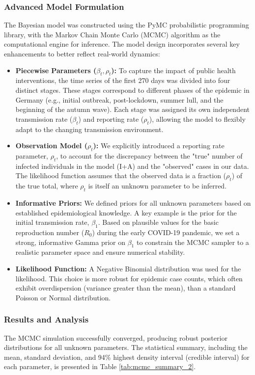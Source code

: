 \documentclass[12pt, a4paper]{article}
\begin{document}
\subsubsection{Advanced Model Formulation}
The Bayesian model was constructed using the PyMC probabilistic programming library, with the Markov Chain Monte Carlo (MCMC) algorithm as the computational engine for inference. The model design incorporates several key enhancements to better reflect real-world dynamics:
\begin{itemize}
    \item \textbf{Piecewise Parameters ($\beta_t, \rho_t$):} To capture the impact of public health interventions, the time series of the first 270 days was divided into four distinct stages. These stages correspond to different phases of the epidemic in Germany (e.g., initial outbreak, post-lockdown, summer lull, and the beginning of the autumn wave). Each stage was assigned its own independent transmission rate ($\beta_t$) and reporting rate ($\rho_t$), allowing the model to flexibly adapt to the changing transmission environment.
    \item \textbf{Observation Model ($\rho_t$):} We explicitly introduced a reporting rate parameter, $\rho_t$, to account for the discrepancy between the "true" number of infected individuals in the model (I+A) and the "observed" cases in our data. The likelihood function assumes that the observed data is a fraction ($\rho_t$) of the true total, where $\rho_t$ is itself an unknown parameter to be inferred.
    \item \textbf{Informative Priors:} We defined priors for all unknown parameters based on established epidemiological knowledge. A key example is the prior for the initial transmission rate, $\beta_1$. Based on plausible values for the basic reproduction number ($R_0$) during the early COVID-19 pandemic, we set a strong, informative Gamma prior on $\beta_1$ to constrain the MCMC sampler to a realistic parameter space and ensure numerical stability.
    \item \textbf{Likelihood Function:} A Negative Binomial distribution was used for the likelihood. This choice is more robust for epidemic case counts, which often exhibit overdispersion (variance greater than the mean), than a standard Poisson or Normal distribution.
\end{itemize}

\subsubsection{Results and Analysis}
The MCMC simulation successfully converged, producing robust posterior distributions for all unknown parameters. The statistical summary, including the mean, standard deviation, and 94\% highest density interval (credible interval) for each parameter, is presented in Table \ref{tab:mcmc_summary_2}.
\end{document}
